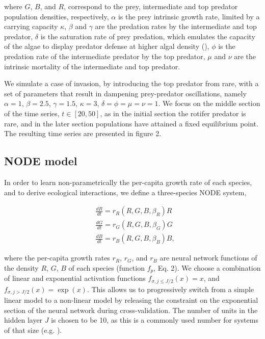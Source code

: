 \documentclass[11pt, oneside]{article}
\begin{document}
where $G$, $B$, and $R$, correspond to the prey, intermediate and top predator population densities, respectively,
$\alpha$ is the prey intrinsic growth rate, limited by a carrying capacity $\kappa$, 
$\beta$ and $\gamma$ are the predation rates by the intermediate and top predator,
$\delta$ is the saturation rate of prey predation, which emulates the capacity of the algae to display predator defense at higher algal density (\cite{Hiltunen2013}),
$\phi$ is the predation rate of the intermediate predator by the top predator,
$\mu$ and $\nu$ are the intrinsic mortality of the intermediate and top predator.

We simulate a case of invasion, by introducing the top predator from rare, with a set of parameters that result in dampening prey-predator oscillations, namely $\alpha = 1$, $\beta = 2.5$, $\gamma = 1.5$, $\kappa = 3$, $\delta = \phi = \mu = \nu = 1$.
We focus on the middle section of the time series, $t \in [20,50]$, as in the initial section the rotifer predator is rare, and in the later section populations have attained a fixed equilibrium point.
The resulting time series are presented in figure 2.

\subsection{NODE model}

In order to learn non-parametrically the per-capita growth rate of each species, and to derive ecological interactions, we define a three-species NODE system,

\vspace{-0.5cm}
\begin{equation} \begin{aligned}
	& \frac{dR}{dt} = r_R(R,G,B,\beta_R) R \\
	& \frac{dG}{dt} = r_G(R,G,B,\beta_G) G \\
	& \frac{dB}{dt} = r_B(R,G,B,\beta_B) B,
\end{aligned} \end{equation}

where the per-capita growth rates $r_R$, $r_G$, and $r_B$ are neural network functions of the density $R$, $G$, $B$ of each species (function $f_p$, Eq. 2).
We choose a combination of linear and exponential activation functions $f_{\sigma, j\leq J/2}(x) = x$, and $f_{\sigma, j>J/2}(x) = \exp(x)$.
This allows us to progressively switch from a simple linear model to a non-linear model by releasing the constraint on the exponential section of the neural network during cross-validation.
The number of units in the hidden layer $J$ is chosen to be 10, as this is a commonly used number for systems of that size (e.g. \cite{Wu2005,Bonnaffe2021a}). 
\end{document}
